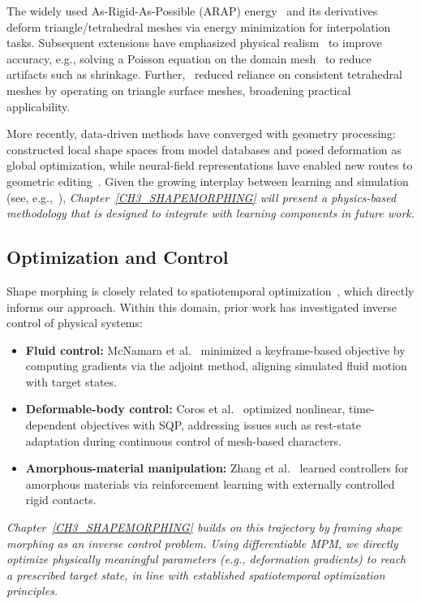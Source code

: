     The widely used As-Rigid-As-Possible (ARAP) energy~\citep{2000-ARAPShapeInterpolation} and its derivatives deform triangle/tetrahedral meshes via energy minimization for interpolation tasks. Subsequent extensions have emphasized physical realism~\citep{2004-ActualMorphing, 2020-HamiltonianShapeInterpolation} to improve accuracy, e.g., solving a Poisson equation on the domain mesh~\citep{2005-PoissonShapeInterpolation} to reduce artifacts such as shrinkage. Further,~\citep{liu2011rigid} reduced reliance on consistent tetrahedral meshes by operating on triangle surface meshes, broadening practical applicability.
    
    More recently, data-driven methods have converged with geometry processing: \citep{2013-DataDrivenShapeMorphing} constructed local shape spaces from model databases and posed deformation as global optimization, while neural-field representations have enabled new routes to geometric editing~\citep{yang2021geometry}. Given the growing interplay between learning and simulation (see, e.g.,~\citep{sharpdeep}), \emph{Chapter~\ref{CH3_SHAPEMORPHING} will present a physics-based methodology that is designed to integrate with learning components in future work.}

\subsection{Optimization and Control}
Shape morphing is closely related to spatiotemporal optimization~\citep{1988-SpacetimeConstraints}, which directly informs our approach. Within this domain, prior work has investigated inverse control of physical systems:
\begin{itemize}
  \item \textbf{Fluid control:} McNamara et al.~\citep{2004-FluidControlAdjointMethod} minimized a keyframe-based objective by computing gradients via the adjoint method, aligning simulated fluid motion with target states.
  \item \textbf{Deformable-body control:} Coros et al.~\citep{2012-DeformableObjectsAlive} optimized nonlinear, time-dependent objectives with SQP, addressing issues such as rest-state adaptation during continuous control of mesh-based characters.
  \item \textbf{Amorphous-material manipulation:} Zhang et al.~\citep{2020-ManipulateAmorphousMaterialsRL} learned controllers for amorphous materials via reinforcement learning with externally controlled rigid contacts.
\end{itemize}
\emph{Chapter~\ref{CH3_SHAPEMORPHING} builds on this trajectory by framing shape morphing as an inverse control problem. Using differentiable MPM, we directly optimize physically meaningful parameters (e.g., deformation gradients) to reach a prescribed target state, in line with established spatiotemporal optimization principles.}

